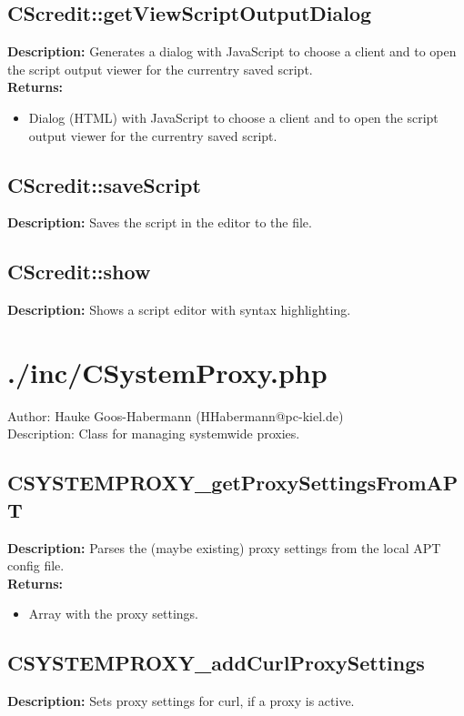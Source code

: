 \subsection{CScredit::getViewScriptOutputDialog}
\textbf{Description:} Generates a dialog with JavaScript to choose a client and to open the script output viewer for the currentry saved script.\\
\textbf{Returns:}
\begin{itemize}
\item Dialog (HTML) with JavaScript to choose a client and to open the script output viewer for the currentry saved script.
\end{itemize}

\subsection{CScredit::saveScript}
\textbf{Description:} Saves the script in the editor to the file.\\

\subsection{CScredit::show}
\textbf{Description:} Shows a script editor with syntax highlighting.\\

\newpage\section{./inc/CSystemProxy.php}
 Author: Hauke Goos-Habermann (HHabermann@pc-kiel.de)\\
 Description: Class for managing systemwide proxies.\\

\subsection{CSYSTEMPROXY\_getProxySettingsFromAPT}
\textbf{Description:} Parses the (maybe existing) proxy settings from the local APT config file.\\
\textbf{Returns:}
\begin{itemize}
\item Array with the proxy settings.
\end{itemize}

\subsection{CSYSTEMPROXY\_addCurlProxySettings}
\textbf{Description:} Sets proxy settings for curl, if a proxy is active.\\

